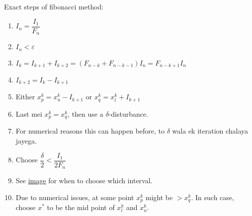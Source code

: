 \documentclass[11pt]{article}
\begin{document}
Exact steps of fibonacci method:
\begin{enumerate}
    \item \(I_n=\dfrac{I_1}{F_n}\)
    \item \(I_n < \varepsilon\)
    \item \(I_k = I_{k+1}+I_{k+2} = (F_{n-k}+F_{n-k-1})I_n = F_{n-k+1}I_n\)
    \item \(I_{k+2} = I_k - I_{k+1}\)
    \item Either \(x_p^k=x_u^k-I_{k+1}\) or \(x_q^k=x_l^k+I_{k+1}\)
    \item Last mei \(x_p^k = x_q^k\), then use a \(\delta\)-disturbance.
    \item For numerical reasons this can happen before, to \(\delta\) wala ek
        iteration chalaya jayega.
    \item Choose \(\dfrac{\delta}{2}<\dfrac{I_1}{2F_n}\)
    \item See \href{https://en.wikipedia.org/wiki/File:GoldenSectionSearch.png}{image}
        for when to choose which interval.
    \item Due to numerical issues, at some point \(x_p^k\) might be \(>x_q^k\).
        In such case, choose \(x^*\) to be the mid point of \(x_l^k\) and \(x^k_u\).
\end{enumerate}
\end{document}
